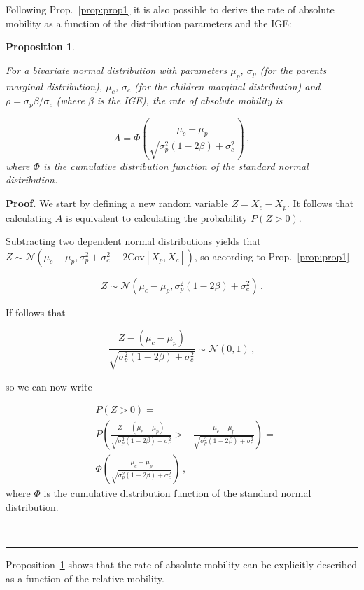 \documentclass[prl,amsmath,twocolumn,nofootinbib]{revtex4}
\newcommand{\elabel}[1]{\label{eq:#1}}
\newcommand{\Pref}[1]{Proposition~\ref{prop:#1}}
\newcommand{\pref}[1]{Prop.~\ref{prop:#1}}
\newcommand{\be}{\begin{equation}}
\newcommand{\ee}{\end{equation}}
\newtheorem{proposition}{Proposition}
\newenvironment{proof}[1][Proof]{\noindent\textbf{#1.} }{\ \rule{0.5em}{0.5em}}
\numberwithin{equation}{section}
\begin{document}
Following \pref{prop1} it is also possible to derive the rate of absolute mobility as a function of the distribution parameters and the IGE:

\begin{proposition}
\label{prop:prop2}

For a bivariate normal distribution with parameters $\mu_p$, $\sigma_p$ (for the parents marginal distribution), $\mu_c$, $\sigma_c$ (for the children marginal distribution) and $\rho=\sigma_p\beta/\sigma_c$ (where $\beta$ is the IGE), the rate of absolute mobility is

\be
A = \Phi\left(\frac{\mu_c - \mu_p}{\sqrt{\sigma_p^2\left(1 - 2\beta\right) + \sigma_c^2}}\right) \,,
\elabel{abs2}
\ee
where $\Phi$ is the cumulative distribution function of the standard normal distribution.
\end{proposition}

\begin{proof}
We start by defining a new random variable $Z = X_c-X_p$. It follows that calculating $A$ is equivalent to calculating the probability $P\left(Z>0\right)$.

Subtracting two dependent normal distributions yields that $Z \sim \mathcal{N}\left(\mu_c - \mu_p,\sigma_p^2 + \sigma_c^2 - 2\text{Cov}\left[X_p,X_c\right]\right)$, so according to \pref{prop1}

\be
Z \sim \mathcal{N}\left(\mu_c - \mu_p,\sigma_p^2\left(1-2\beta\right) + \sigma_c^2\right)\,.
\ee

If follows that

\be
\frac{Z - \left(\mu_c - \mu_p\right)}{\sqrt{\sigma_p^2\left(1-2\beta\right) + \sigma_c^2}} \sim \mathcal{N}\left(0,1\right)\,,
\ee

so we can now write

\be
\begin{split}
&P\left(Z>0\right) = \\ & P\left(\frac{Z - (\mu_c - \mu_p)}{\sqrt{\sigma_p^2\left(1-2\beta\right) + \sigma_c^2}} > -\frac{\mu_c - \mu_p}{\sqrt{\sigma_p^2\left(1-2\beta\right) + \sigma_c^2}} \right) = \\ &\Phi\left(\frac{\mu_c - \mu_p}{\sqrt{\sigma_p^2\left(1 - 2\beta\right) + \sigma_c^2}}\right) \,,
\end{split}
\ee
where $\Phi$ is the cumulative distribution function of the standard normal distribution.

\end{proof}

\Pref{prop2} shows that the rate of absolute mobility can be explicitly described as a function of the relative mobility.



\end{document}
